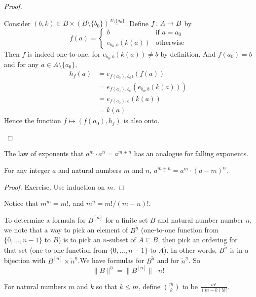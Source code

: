 \begin{lemma}
\begin{proof}
\begin{itemize}
			Consider $(b,k)\in B\times (B\setminus\{b_0\})^{\underline{A\setminus\{a_0\}}}$. Define ${f}\colon{A}\to{B}$ by
			\[
			f(a) = \begin{cases}
			b & \text{if $a=a_0$}\\
			e_{b_0,b}(k(a)) &\text{otherwise}
			\end{cases}
			\]
			Then $f$ is indeed one-to-one, for $e_{b_0,b}(k(a))\neq b$ by definition.
			And $f(a_0)=b$ and for any $a\in A\setminus\{a_0\}$, 
			\begin{align*}
			h_f(a)  &= e_{f(a_0),b_0)}(f(a))\\
			&= e_{f(a_0),b_0}(e_{b_0,b}(k(a)))\\
			&= e_{f(a_0),b}(k(a))\\
			&= k(a)
			\end{align*}
			Hence the function $f\mapsto (f(a_0), h_f)$ is also onto.
		\end{itemize}
	\end{proof}
\end{lemma}
\printbreak

The law of exponents that $a^m\cdot a^n = a^{m+n}$ has an analogue for falling exponents.

\begin{lemma}
	For any integer $a$ and natural numbers $m$ and $n$, $a^{\underline{m+n}} = a^{\underline m}\cdot (a-m)^{\underline n}$.
	
	\begin{proof}
		Exercise. Use induction on $m$.
	\end{proof}
\end{lemma}

Notice that $m^{\underline m} = m!$, and $m^{\underline n} = m!/(m-n)!$.

To determine a formula for $B^{[n]}$ for a finite set $B$ and natural number number $n$, we note that a way to pick an element of $B^{\underline{\tilde{n}}}$ (one-to-one function from $\{0,\ldots,n-1\}$ to $B$)
is to pick an $n$-subset of $A\subseteq B$, then pick an ordering for that set (one-to-one function from $\{0,\ldots, n-1\}$ to $A$). 
In other words,
$B^{\underline{\tilde{n}}}$ is in a bijection with $B^{[n]}\times \tilde{n}^{\underline{\tilde{n}}}$.We have formulas for $B^{\underline{\tilde{n}}}$
and for $\tilde{n}^{\underline{\tilde{n}}}$. 
So 
\[\lVert B\rVert^{\underline n} = \lVert B^{[n]}\rVert \cdot n!\]

\begin{defn}
	For natural numbers $m$ and $k$ so that $k\leq m$, define $\binom{m}{k}$ to be $\frac{m!}{(m-k)!k!}$. 
\end{defn}

